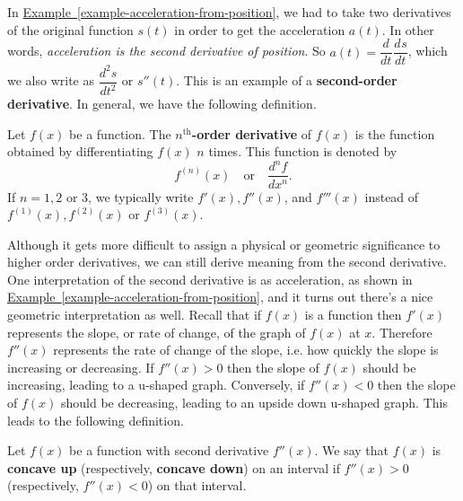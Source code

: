 \documentclass[10pt,]{book}
\newcommand{\terminology}[1]{\textbf{#1}}
\theoremstyle{ptxplainnotitle}
\theoremstyle{ptxplaintitle}
\theoremstyle{ptxplainnotitle}
\theoremstyle{ptxplaintitle}
\theoremstyle{ptxplainnotitle}
\theoremstyle{ptxplaintitle}
\theoremstyle{ptxdefinitionnotitle}
\theoremstyle{ptxdefinitiontitle}
\theoremstyle{ptxdefinitionnotitle}
\theoremstyle{ptxdefinitiontitle}
\theoremstyle{ptxdefinitionnotitle}
\theoremstyle{ptxdefinitiontitle}
\theoremstyle{ptxdefinitionnotitle}
\theoremstyle{ptxdefinitiontitle}
\theoremstyle{ptxdefinitionnotitle}
\theoremstyle{ptxdefinitiontitle}
\numberwithin{equation}{section}
\newcommand{\dv}[3][]{\dfrac{d^{#1} #2}{d #3^{#1}}}
\begin{document}
\hypertarget{p-118}{}%
In \hyperref[example-acceleration-from-position]{Example~\ref{example-acceleration-from-position}}, we had to take two derivatives of the original function \(s(t)\) in order to get the acceleration \(a(t)\). In other words, \emph{acceleration is the second derivative of position}. So \(a(t) = \dv{}{t}\dv{s}{t}\), which we also write as \(\dv[2]{s}{t}\) or \(s''(t)\). This is an example of a \terminology{second-order derivative}. In general, we have the following definition.%
\begin{definition}\label{definition-nth-order-derivatives}
\hypertarget{p-119}{}%
Let \(f(x)\) be a function. The \terminology{\(n^{\text{th}}\)-order derivative} of \(f(x)\) is the function obtained by differentiating \(f(x)\) \(n\) times. This function is denoted by%
\begin{equation*}
f^{(n)}(x)\quad\text{or}\quad\dv[n]{f}{x}.
\end{equation*}
If \(n=1, 2\) or \(3\), we typically write \(f'(x), f''(x)\), and \(f'''(x)\) instead of \(f^{(1)}(x), f^{(2)}(x)\) or \(f^{(3)}(x)\).%
\end{definition}
\hypertarget{p-120}{}%
Although it gets more difficult to assign a physical or geometric significance to higher order derivatives, we can still derive meaning from the second derivative. One interpretation of the second derivative is as acceleration, as shown in \hyperref[example-acceleration-from-position]{Example~\ref{example-acceleration-from-position}}, and it turns out there's a nice geometric interpretation as well. Recall that if \(f(x)\) is a function then \(f'(x)\) represents the slope, or rate of change, of the graph of \(f(x)\) at \(x\). Therefore \(f''(x)\) represents the rate of change of the slope, i.e. how quickly the slope is increasing or decreasing. If \(f''(x) >0\) then the slope of \(f(x)\) should be increasing, leading to a u-shaped graph. Conversely, if \(f''(x) <0\) then the slope of \(f(x)\) should be decreasing, leading to an upside down u-shaped graph. This leads to the following definition.%
\begin{definition}[{Concavity.}]\label{definition-concavity}
\hypertarget{p-121}{}%
Let \(f(x)\) be a function with second derivative \(f''(x)\). We say that \(f(x)\) is \terminology{concave up} (respectively, \terminology{concave down}) on an interval if \(f''(x)>0\) (respectively, \(f''(x) <0\)) on that interval.%
\end{definition}
\end{document}
